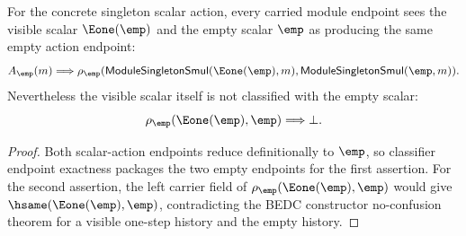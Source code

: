 \begin{theorem}
\label{thm:module-singleton-smul-nonfaithful-visible-scalar}
For the concrete singleton scalar action, every carried module endpoint sees
the visible scalar $\Eone(\emp)$ and the empty scalar $\emp$ as producing the
same empty action endpoint:
$$
A_{\emp}(m)\Longrightarrow
\rho_{\emp}(\mathsf{ModuleSingletonSmul}(\Eone(\emp),m),
\mathsf{ModuleSingletonSmul}(\emp,m)).
$$
Nevertheless the visible scalar itself is not classified with the empty scalar:
$$
\rho_{\emp}(\Eone(\emp),\emp)\Longrightarrow\bot.
$$
\end{theorem}
\begin{proof}
Both scalar-action endpoints reduce definitionally to $\emp$, so classifier
endpoint exactness packages the two empty endpoints for the first assertion.
For the second assertion, the left carrier field of
$\rho_{\emp}(\Eone(\emp),\emp)$ would give
$\hsame(\Eone(\emp),\emp)$, contradicting the BEDC constructor
no-confusion theorem for a visible one-step history and the empty history.
\end{proof}

